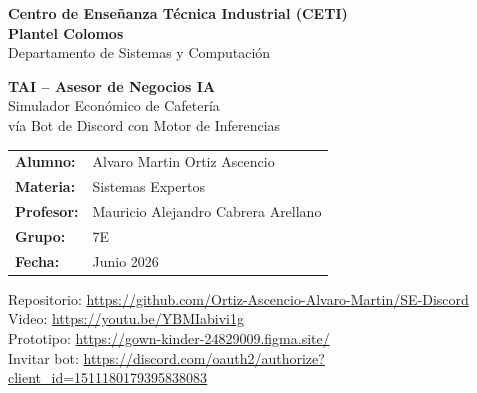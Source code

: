 \documentclass[12pt,spanish]{article}
\begin{document}
\begin{titlepage}
  \centering
  \vspace*{1.5cm}

  {\Large\bfseries Centro de Enseñanza Técnica Industrial (CETI)\\[0.3em]
  Plantel Colomos}\\[0.5em]
  {\large Departamento de Sistemas y Computación}

  \vspace{2.5cm}

  \begin{tcolorbox}[
    colback=accent!8, colframe=accent,
    width=\textwidth, arc=6pt,
    title={\bfseries\large\color{white} Proyecto Final -- Sistemas Expertos},
    fonttitle=\large\bfseries
  ]
    \centering\vspace{0.5em}
    {\LARGE\bfseries TAI -- Asesor de Negocios IA}\\[0.4em]
    {\large Simulador Económico de Cafetería\\
    vía Bot de Discord con Motor de Inferencias}
    \vspace{0.5em}
  \end{tcolorbox}

  \vspace{2cm}

  \begin{tabular}{ll}
    \textbf{Alumno:}   & Alvaro Martin Ortiz Ascencio \\[4pt]
    \textbf{Materia:}  & Sistemas Expertos \\[4pt]
    \textbf{Profesor:} & Mauricio Alejandro Cabrera Arellano \\[4pt]
    \textbf{Grupo:}    & 7E \\[4pt]
    \textbf{Fecha:}    & Junio 2026 \\
  \end{tabular}

  \vfill
  {\small\color{gray}
  Repositorio: \url{https://github.com/Ortiz-Ascencio-Alvaro-Martin/SE-Discord}\\[2pt]
  Video: \url{https://youtu.be/YBMIabivi1g}\\[2pt]
  Prototipo: \url{https://gown-kinder-24829009.figma.site/}\\[2pt]
  Invitar bot: \url{https://discord.com/oauth2/authorize?client_id=1511180179395838083}}
\end{titlepage}
\end{document}
